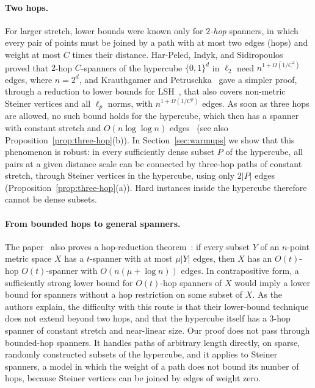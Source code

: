 \documentclass[11pt]{article}
\theoremstyle{definition}
\theoremstyle{remark}
\begin{document}
\paragraph{Two hops.}
For larger stretch, lower bounds were known only for \emph{$2$-hop} spanners, in which every pair of points must be joined by a path with at most two edges (hops) and weight at most $C$ times their distance. Har-Peled, Indyk, and Sidiropoulos~\cite{harpeled2013euclidean} proved that $2$-hop $C$-spanners of the hypercube $\{0, 1\}^d$ in $\ell_2$ need $n^{1 + \Omega(1/C^2)}$ edges, where $n = 2^d$, and Krauthgamer and Petruschka~\cite[Theorem~1.2 and Remark~3.2]{krauthgamer2026towards} gave a simpler proof, through a reduction to lower bounds for LSH~\cite{motwani2007lower}, that also covers non-metric Steiner vertices and all $\ell_p$ norms, with $n^{1 + \Omega(1/C^p)}$ edges. As soon as three hops are allowed, no such bound holds for the hypercube, which then has a spanner with constant stretch and $O(n \log \log n)$ edges~\cite[Theorem~A.1]{krauthgamer2026towards} (see also Proposition~\ref{prop:three-hop}(b)). In Section~\ref{sec:warmups} we show that this phenomenon is robust: in every sufficiently dense subset $P$ of the hypercube, all pairs at a given distance scale can be connected by three-hop paths of constant stretch, through Steiner vertices in the hypercube, using only $2|P|$ edges (Proposition~\ref{prop:three-hop}(a)). Hard instances inside the hypercube therefore cannot be dense subsets.

\paragraph{From bounded hops to general spanners.}
The paper~\cite{krauthgamer2026towards} also proves a hop-reduction theorem~\cite[Theorem~1.3]{krauthgamer2026towards}: if every subset $Y$ of an $n$-point metric space $X$ has a $t$-spanner with at most $\mu |Y|$ edges, then $X$ has an $O(t)$-hop $O(t)$-spanner with $O(n(\mu + \log n))$ edges. In contrapositive form, a sufficiently strong lower bound for $O(t)$-hop spanners of $X$ would imply a lower bound for spanners without a hop restriction on some subset of $X$. As the authors explain, the difficulty with this route is that their lower-bound technique does not extend beyond two hops, and that the hypercube itself has a $3$-hop spanner of constant stretch and near-linear size. Our proof does not pass through bounded-hop spanners. It handles paths of arbitrary length directly, on sparse, randomly constructed subsets of the hypercube, and it applies to Steiner spanners, a model in which the weight of a path does not bound its number of hops, because Steiner vertices can be joined by edges of weight zero.
\end{document}
